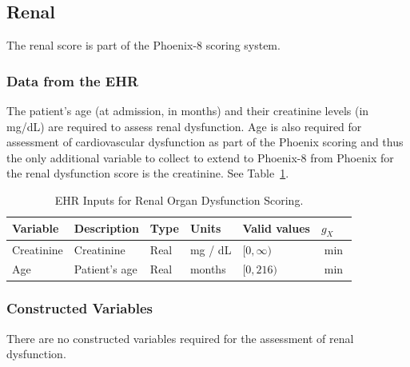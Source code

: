 \documentclass[letterpaper,10pt]{article}
\begin{document}
\subsection{Renal}\label{sec:renal}
The renal score is part of the Phoenix-8 scoring system.

\subsubsection{Data from the EHR}\label{sec:renal-ehr}
The patient's age (at admission, in months) and their creatinine levels (in
mg/dL) are required to assess renal dysfunction.  Age is also required for
assessment of cardiovascular dysfunction as part of the Phoenix scoring and thus
the only additional variable to collect to extend to Phoenix-8 from Phoenix for
the renal dysfunction score is the creatinine.
See Table~\ref{tab:renal-ehr}.
\begin{table}
  \centering
  \caption{EHR Inputs for Renal Organ Dysfunction Scoring.}
  \label{tab:renal-ehr}
  \small
  \begin{tabular}{llllll}
    \toprule
    \textbf{Variable} &
    \textbf{Description} &
    \textbf{Type} &
    \textbf{Units} &
    \textbf{Valid values} &
    \textbf{$g_X$} \\
    \midrule

    \rowcolor{gray!20}
    Creatinine &
    Creatinine &
    Real &
    mg / dL &
    $[0, \infty)$ &
    $\min$ \\
    Age & Patient's age & Real & months & $[0, 216)$ & $\min$ \\
    \bottomrule
  \end{tabular}
\end{table}

\subsubsection{Constructed Variables}\label{sec:renal-constructed}
There are no constructed variables required for the assessment of renal
dysfunction.
\end{document}
